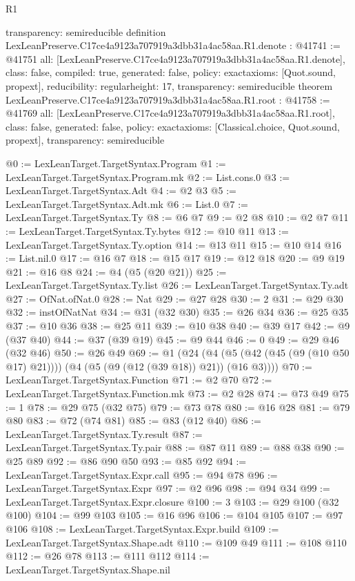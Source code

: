 \begin{lexlean}{R1}
\begin{coremodule}
{  transparency: semireducible
}
definition LexLeanPreserve.C17ce4a9123a707919a3dbb31a4ac58aa.R1.denote : @41741 := @41751 {
  all: [LexLeanPreserve.C17ce4a9123a707919a3dbb31a4ac58aa.R1.denote],
  class: false,
  compiled: true,
  generated: false,
  policy: exact{axioms: [Quot.sound, propext]},
  reducibility: regular{height: 17},
  transparency: semireducible
}
theorem LexLeanPreserve.C17ce4a9123a707919a3dbb31a4ac58aa.R1.root : @41758 := @41769 {
  all: [LexLeanPreserve.C17ce4a9123a707919a3dbb31a4ac58aa.R1.root],
  class: false,
  generated: false,
  policy: exact{axioms: [Classical.choice, Quot.sound, propext]},
  transparency: semireducible
}

@0 := LexLeanTarget.TargetSyntax.Program
@1 := LexLeanTarget.TargetSyntax.Program.mk
@2 := List.cons.{0}
@3 := LexLeanTarget.TargetSyntax.Adt
@4 := @2 @3
@5 := LexLeanTarget.TargetSyntax.Adt.mk
@6 := List.{0}
@7 := LexLeanTarget.TargetSyntax.Ty
@8 := @6 @7
@9 := @2 @8
@10 := @2 @7
@11 := LexLeanTarget.TargetSyntax.Ty.bytes
@12 := @10 @11
@13 := LexLeanTarget.TargetSyntax.Ty.option
@14 := @13 @11
@15 := @10 @14
@16 := List.nil.{0}
@17 := @16 @7
@18 := @15 @17
@19 := @12 @18
@20 := @9 @19
@21 := @16 @8
@24 := @4 (@5 (@20 @21))
@25 := LexLeanTarget.TargetSyntax.Ty.list
@26 := LexLeanTarget.TargetSyntax.Ty.adt
@27 := OfNat.ofNat.{0}
@28 := Nat
@29 := @27 @28
@30 := 2
@31 := @29 @30
@32 := instOfNatNat
@34 := @31 (@32 @30)
@35 := @26 @34
@36 := @25 @35
@37 := @10 @36
@38 := @25 @11
@39 := @10 @38
@40 := @39 @17
@42 := @9 (@37 @40)
@44 := @37 (@39 @19)
@45 := @9 @44
@46 := 0
@49 := @29 @46 (@32 @46)
@50 := @26 @49
@69 := @1
    (@24 (@4 (@5 (@42 (@45 (@9 (@10 @50 @17) @21)))) (@4 (@5 (@9 (@12 (@39 @18)) @21)) (@16 @3))))
@70 := LexLeanTarget.TargetSyntax.Function
@71 := @2 @70
@72 := LexLeanTarget.TargetSyntax.Function.mk
@73 := @2 @28
@74 := @73 @49
@75 := 1
@78 := @29 @75 (@32 @75)
@79 := @73 @78
@80 := @16 @28
@81 := @79 @80
@83 := @72 (@74 @81)
@85 := @83 (@12 @40)
@86 := LexLeanTarget.TargetSyntax.Ty.result
@87 := LexLeanTarget.TargetSyntax.Ty.pair
@88 := @87 @11
@89 := @88 @38
@90 := @25 @89
@92 := @86 @90 @50
@93 := @85 @92
@94 := LexLeanTarget.TargetSyntax.Expr.call
@95 := @94 @78
@96 := LexLeanTarget.TargetSyntax.Expr
@97 := @2 @96
@98 := @94 @34
@99 := LexLeanTarget.TargetSyntax.Expr.closure
@100 := 3
@103 := @29 @100 (@32 @100)
@104 := @99 @103
@105 := @16 @96
@106 := @104 @105
@107 := @97 @106
@108 := LexLeanTarget.TargetSyntax.Expr.build
@109 := LexLeanTarget.TargetSyntax.Shape.adt
@110 := @109 @49
@111 := @108 @110
@112 := @26 @78
@113 := @111 @112
@114 := LexLeanTarget.TargetSyntax.Shape.nil

\end{coremodule}
\end{lexlean}
